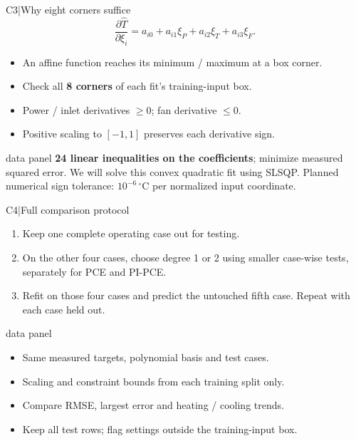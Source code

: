 \begin{frame}[more-space,label=backup-C3]{C3\enspace|\enspace Why eight corners suffice}
  \small
  \[
    \frac{\partial\widehat T}{\partial \xi_i}
      =a_{i0}+a_{i1}\xi_P+a_{i2}\xi_T+a_{i3}\xi_F.
  \]
  \begin{itemize}
    \item An affine function reaches its minimum / maximum at a box corner.
    \item Check all \textbf{8 corners} of each fit's training-input box.
    \item Power / inlet derivatives $\geq0$; fan derivative $\leq0$.
    \item Positive scaling to $[-1,1]$ preserves each derivative sign.
  \end{itemize}
  \medskip
  \begin{beamercolorbox}[sep=2mm,wd=\textwidth]{data panel}
    \textbf{24 linear inequalities on the coefficients}; minimize measured squared error.
    We will solve this convex quadratic fit using SLSQP. Planned numerical sign tolerance:
    $10^{-6}\,{}^\circ$C per normalized input coordinate.
  \end{beamercolorbox}
\end{frame}

\renewcommand{\backupcode}{C4}

\begin{frame}[more-space,label=backup-C4]{C4\enspace|\enspace Full comparison protocol}
  \small
  \begin{enumerate}
    \item Keep one complete operating case out for testing.
    \item On the other four cases, choose degree 1 or 2 using smaller case-wise tests,
      separately for PCE and PI-PCE.
    \item Refit on those four cases and predict the untouched fifth case.
      Repeat with each case held out.
  \end{enumerate}
  \medskip
  \begin{beamercolorbox}[sep=2mm,wd=\textwidth]{data panel}
    \begin{itemize}
      \item Same measured targets, polynomial basis and test cases.
      \item Scaling and constraint bounds from each training split only.
      \item Compare RMSE, largest error and heating / cooling trends.
      \item Keep all test rows; flag settings outside the training-input box.
    \end{itemize}
  \end{beamercolorbox}
\end{frame}

